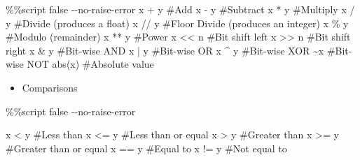 \documentclass[
  letterpaper,
  DIV=11,
  numbers=noendperiod]{scrreprt}
\newenvironment{Shaded}{\begin{snugshade}}{\end{snugshade}}
\newcommand{\BuiltInTok}[1]{\textcolor[rgb]{0.00,0.46,0.62}{#1}}
\newcommand{\CommentTok}[1]{\textcolor[rgb]{0.37,0.37,0.37}{#1}}
\newcommand{\ControlFlowTok}[1]{\textcolor[rgb]{0.00,0.46,0.62}{#1}}
\newcommand{\NormalTok}[1]{\textcolor[rgb]{0.00,0.46,0.62}{#1}}
\newcommand{\OperatorTok}[1]{\textcolor[rgb]{0.37,0.37,0.37}{#1}}
\providecommand{\tightlist}{%
  \setlength{\itemsep}{0pt}\setlength{\parskip}{0pt}}
\begin{document}
\begin{Shaded}
\begin{Highlighting}[]
\OperatorTok{\%\%}\NormalTok{script false }\OperatorTok{{-}{-}}\NormalTok{no}\OperatorTok{{-}}\ControlFlowTok{raise}\OperatorTok{{-}}\NormalTok{error}
\NormalTok{x }\OperatorTok{+}\NormalTok{ y      }\CommentTok{\#Add}
\NormalTok{x }\OperatorTok{{-}}\NormalTok{ y      }\CommentTok{\#Subtract}
\NormalTok{x }\OperatorTok{*}\NormalTok{ y      }\CommentTok{\#Multiply}
\NormalTok{x }\OperatorTok{/}\NormalTok{ y      }\CommentTok{\#Divide (produces a float)}
\NormalTok{x }\OperatorTok{//}\NormalTok{ y     }\CommentTok{\#Floor Divide (produces an integer)}
\NormalTok{x }\OperatorTok{\%}\NormalTok{ y      }\CommentTok{\#Modulo (remainder)}
\NormalTok{x }\OperatorTok{**}\NormalTok{ y     }\CommentTok{\#Power}
\NormalTok{x }\OperatorTok{\textless{}\textless{}}\NormalTok{ n     }\CommentTok{\#Bit shift left}
\NormalTok{x }\OperatorTok{\textgreater{}\textgreater{}}\NormalTok{ n     }\CommentTok{\#Bit shift right}
\NormalTok{x }\OperatorTok{\&}\NormalTok{ y      }\CommentTok{\#Bit{-}wise AND}
\NormalTok{x }\OperatorTok{|}\NormalTok{ y      }\CommentTok{\#Bit{-}wise OR}
\NormalTok{x }\OperatorTok{\^{}}\NormalTok{ y      }\CommentTok{\#Bit{-}wise XOR}
\OperatorTok{\textasciitilde{}}\NormalTok{x         }\CommentTok{\#Bit{-}wise NOT}
\BuiltInTok{abs}\NormalTok{(x)     }\CommentTok{\#Absolute value}
\end{Highlighting}
\end{Shaded}

\begin{itemize}
\tightlist
\item
  Comparisons
\end{itemize}

\begin{Shaded}
\begin{Highlighting}[]
\OperatorTok{\%\%}\NormalTok{script false }\OperatorTok{{-}{-}}\NormalTok{no}\OperatorTok{{-}}\ControlFlowTok{raise}\OperatorTok{{-}}\NormalTok{error}

\NormalTok{x }\OperatorTok{\textless{}}\NormalTok{ y      }\CommentTok{\#Less than}
\NormalTok{x }\OperatorTok{\textless{}=}\NormalTok{ y     }\CommentTok{\#Less than or equal}
\NormalTok{x }\OperatorTok{\textgreater{}}\NormalTok{ y      }\CommentTok{\#Greater than}
\NormalTok{x }\OperatorTok{\textgreater{}=}\NormalTok{ y     }\CommentTok{\#Greater than or equal}
\NormalTok{x }\OperatorTok{==}\NormalTok{ y     }\CommentTok{\#Equal to}
\NormalTok{x }\OperatorTok{!=}\NormalTok{ y     }\CommentTok{\#Not equal to}
\end{Highlighting}
\end{Shaded}
\end{document}
